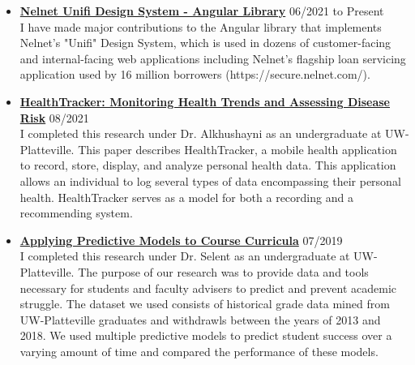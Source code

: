 \documentclass[11pt]{article}
\newcommand{\project}[3]{\vspace{1.5mm}
  \textbf{#1} \hfill #2 #3
}
\begin{document}
\begin{itemize}[leftmargin=*]
	\item[]
	      \project
	      {\href{https://angular.unifi.nelnet.io/}{Nelnet Unifi Design System - Angular Library}}
	      {06/2021 to Present}
	      {\\I have made major contributions to the Angular library that implements Nelnet's "Unifi" Design System, which is used in dozens of customer-facing and internal-facing web applications including Nelnet's flagship loan servicing application used by 16 million borrowers (https://secure.nelnet.com/).}
	\item[]
	      \project
	      {\href{https://www.researchgate.net/publication/349682373_Health_tracker_data_acquisition_and_analysis_for_monitoring_health_trends_and_assessing_disease_risk}{HealthTracker: Monitoring Health Trends and Assessing Disease Risk}}
	      {08/2021}
	      {\\I completed this research under Dr. Alkhushayni as an undergraduate at UW-Platteville. This paper describes HealthTracker, a mobile health application to record, store, display, and analyze personal health data. This application allows an individual to log several types of data encompassing their personal health. HealthTracker serves as a model for both a recording and a recommending system.}
	\item[]
	      \project
	      {\href{https://afitz.space/files/2019_WSTS_Poster.pdf}{Applying Predictive Models to Course Curricula}}
	      {07/2019}
	      {\\I completed this research under Dr. Selent as an undergraduate at UW-Platteville. The purpose of our research was to provide data and tools necessary for students and faculty advisers to predict and prevent academic struggle. The dataset we used consists of historical grade data mined from UW-Platteville graduates and withdrawls between the years of 2013 and 2018. We used multiple predictive models to predict student success over a varying amount of time and compared the performance of these models.}
\end{itemize}
\ 
\end{document}
